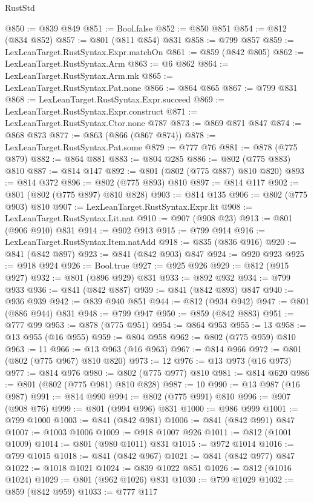 \begin{lexlean}{RustStd}
\begin{coremodule}
{\begin{coremodule}
{{{{{@850 := @839 @849
@851 := Bool.false
@852 := @850 @851
@854 := @812 (@834 @852)
@857 := @801 (@811 @854) @831
@858 := @799 @857
@859 := LexLeanTarget.RustSyntax.Expr.matchOn
@861 := @859 (@842 @805)
@862 := LexLeanTarget.RustSyntax.Arm
@863 := @6 @862
@864 := LexLeanTarget.RustSyntax.Arm.mk
@865 := LexLeanTarget.RustSyntax.Pat.none
@866 := @864 @865
@867 := @799 @831
@868 := LexLeanTarget.RustSyntax.Expr.succeed
@869 := LexLeanTarget.RustSyntax.Expr.construct
@871 := LexLeanTarget.RustSyntax.Ctor.none @787
@873 := @869 @871 @847
@874 := @868 @873
@877 := @863 (@866 (@867 @874))
@878 := LexLeanTarget.RustSyntax.Pat.some
@879 := @777 @76
@881 := @878 (@775 @879)
@882 := @864 @881
@883 := @804 @285
@886 := @802 (@775 @883) @810
@887 := @814 @147
@892 := @801 (@802 (@775 @887) @810 @820)
@893 := @814 @372
@896 := @802 (@775 @893) @810
@897 := @814 @117
@902 := @801 (@802 (@775 @897) @810 @828)
@903 := @814 @135
@906 := @802 (@775 @903) @810
@907 := LexLeanTarget.RustSyntax.Expr.lit
@908 := LexLeanTarget.RustSyntax.Lit.nat
@910 := @907 (@908 @23)
@913 := @801 (@906 @910) @831
@914 := @902 @913
@915 := @799 @914
@916 := LexLeanTarget.RustSyntax.Item.natAdd
@918 := @835 (@836 @916)
@920 := @841 (@842 @897)
@923 := @841 (@842 @903) @847
@924 := @920 @923
@925 := @918 @924
@926 := Bool.true
@927 := @925 @926
@929 := @812 (@915 @927)
@932 := @801 (@896 @929) @831
@933 := @892 @932
@934 := @799 @933
@936 := @841 (@842 @887)
@939 := @841 (@842 @893) @847
@940 := @936 @939
@942 := @839 @940 @851
@944 := @812 (@934 @942)
@947 := @801 (@886 @944) @831
@948 := @799 @947
@950 := @859 (@842 @883)
@951 := @777 @99
@953 := @878 (@775 @951)
@954 := @864 @953
@955 := 13
@958 := @13 @955 (@16 @955)
@959 := @804 @958
@962 := @802 (@775 @959) @810
@963 := 11
@966 := @13 @963 (@16 @963)
@967 := @814 @966
@972 := @801 (@802 (@775 @967) @810 @820)
@973 := 12
@976 := @13 @973 (@16 @973)
@977 := @814 @976
@980 := @802 (@775 @977) @810
@981 := @814 @620
@986 := @801 (@802 (@775 @981) @810 @828)
@987 := 10
@990 := @13 @987 (@16 @987)
@991 := @814 @990
@994 := @802 (@775 @991) @810
@996 := @907 (@908 @76)
@999 := @801 (@994 @996) @831
@1000 := @986 @999
@1001 := @799 @1000
@1003 := @841 (@842 @981)
@1006 := @841 (@842 @991) @847
@1007 := @1003 @1006
@1009 := @918 @1007 @926
@1011 := @812 (@1001 @1009)
@1014 := @801 (@980 @1011) @831
@1015 := @972 @1014
@1016 := @799 @1015
@1018 := @841 (@842 @967)
@1021 := @841 (@842 @977) @847
@1022 := @1018 @1021
@1024 := @839 @1022 @851
@1026 := @812 (@1016 @1024)
@1029 := @801 (@962 @1026) @831
@1030 := @799 @1029
@1032 := @859 (@842 @959)
@1033 := @777 @117
}}}}}
\end{coremodule}}
\end{coremodule}
\end{lexlean}
